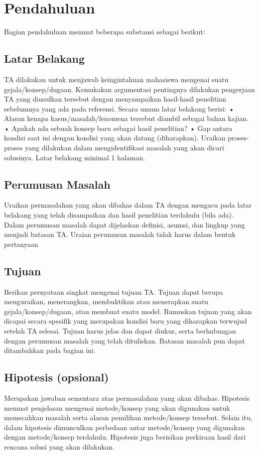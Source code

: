 \chapter{Pendahuluan}
Bagian pendahuluan memuat beberapa substansi sebagai berikut:

\section{Latar Belakang}
TA dilakukan untuk menjawab keingintahuan mahasiswa mengenai suatu gejala/konsep/dugaan. Kemukakan argumentasi pentingnya dilakukan pengerjaan TA yang diusulkan tersebut dengan menyampaikan hasil-hasil penelitian sebelumnya yang ada pada referensi. Secara umum latar belakang berisi:
• Alasan kenapa kasus/masalah/fenomena tersebut diambil sebagai bahan kajian.
• Apakah ada sebuah konsep baru sebagai hasil penelitian?
• Gap antara kondisi saat ini dengan kondisi yang akan datang (diharapkan).
Uraikan proses-proses yang dilakukan dalam mengidentifikasi masalah yang akan dicari solusinya. Latar belakang minimal 1 halaman.

\section{Perumusan Masalah}
Uraikan permasalahan yang akan dibahas dalam TA dengan mengacu pada latar belakang yang telah disampaikan dan hasil penelitian terdahulu (bila ada). Dalam perumusan masalah dapat dijelaskan definisi, asumsi, dan lingkup yang menjadi batasan TA. Uraian perumusan masalah tidak harus dalam bentuk pertanyaan

\section{Tujuan}
Berikan pernyataan singkat mengenai tujuan TA. Tujuan dapat berupa menguraikan, menerangkan, membuktikan atau menerapkan suatu gejala/konsep/dugaan, atau membuat suatu model. Rumuskan tujuan yang akan dicapai secara spesifik yang merupakan kondisi baru yang diharapkan terwujud setelah TA selesai. Tujuan harus jelas dan dapat diukur, serta berhubungan dengan perumusan masalah yang telah dituliskan. Batasan masalah pun dapat ditambahkan pada bagian ini.
        
\section{Hipotesis (opsional)}
Merupakan jawaban sementara atas permasalahan yang akan dibahas. Hipotesis memuat penjelasan mengenai metode/konsep yang akan digunakan untuk memecahkan masalah serta alasan pemilihan metode/konsep tersebut. Selain itu, dalam hipotesis dimunculkan perbedaan antar metode/konsep yang digunakan dengan metode/konsep terdahulu. Hipotesis juga berisikan perkiraan hasil dari rencana solusi yang akan dilakukan.


